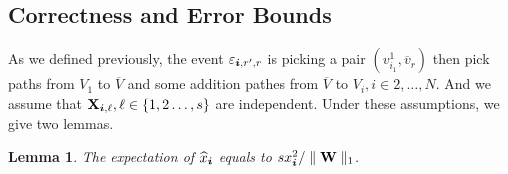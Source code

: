 \documentclass[letterpaper]{article}
\newcommand{\V}[1]{{\bm{{\MakeLowercase{#1}}}}}
\newcommand{\M}[1]{{\bm{\mathbf{\MakeUppercase{#1}}}}}
\newcommand{\norm}[2]{\parallel#1\parallel_{#2}}
\newtheorem{lemma}{Lemma}
\begin{document}
\subsection{Correctness and Error Bounds}

As we defined previously, the event $\varepsilon_{\V{i},r',r}$ is picking a pair $(v^1_{i_1},\overline{v}_r)$ then pick paths from $V_1$ to $\overline{V}$ and some addition pathes from $\overline{V}$ to $V_i,i\in{2,\ldots,N}$. And we assume that $\M{X}_{\V{i},\ell},\ell\in\{1,2\ldots,s\}$ are independent. Under these assumptions, we give two lemmas.

\begin{lemma}\label{lem:Expectation}
The expectation of $\widehat{x}_{\V{i}}$ equals to $sx^2_{\V{i}}/\norm{\M{W}}{1}$.
\end{lemma}
\end{document}
